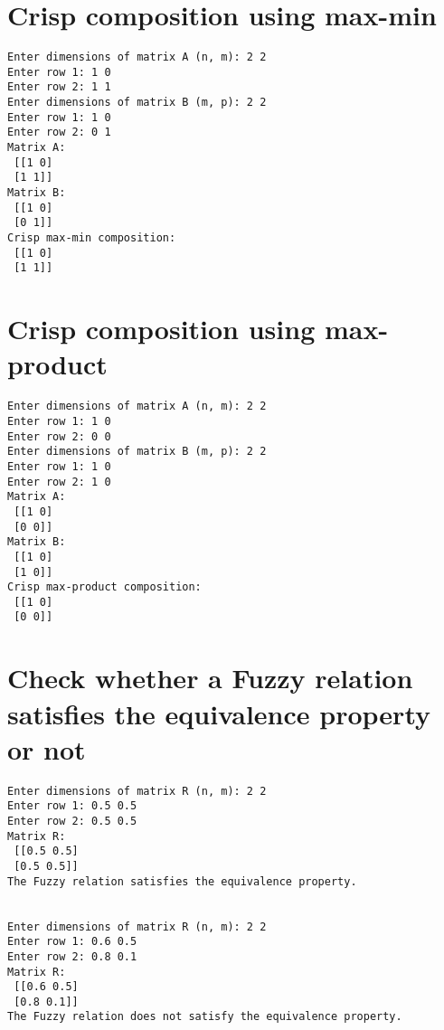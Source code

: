 \documentclass[12pt]{article}
\begin{document}
\newpage
\section{Crisp composition using max-min}



\newpage
\begin{lstlisting}[caption=Output of Crisp max-min composition]
Enter dimensions of matrix A (n, m): 2 2
Enter row 1: 1 0
Enter row 2: 1 1
Enter dimensions of matrix B (m, p): 2 2
Enter row 1: 1 0
Enter row 2: 0 1
Matrix A:
 [[1 0]
 [1 1]]
Matrix B:
 [[1 0]
 [0 1]]
Crisp max-min composition:
 [[1 0]
 [1 1]]
\end{lstlisting}

\newpage
\section{Crisp composition using max-product}



\newpage
\begin{lstlisting}[caption=Output of Crisp max-product composition]
Enter dimensions of matrix A (n, m): 2 2
Enter row 1: 1 0
Enter row 2: 0 0
Enter dimensions of matrix B (m, p): 2 2
Enter row 1: 1 0
Enter row 2: 1 0
Matrix A:
 [[1 0]
 [0 0]]
Matrix B:
 [[1 0]
 [1 0]]
Crisp max-product composition:
 [[1 0]
 [0 0]]
\end{lstlisting}

\newpage
\section{Check whether a Fuzzy relation satisfies the equivalence property or not}



\begin{lstlisting}[caption=Output of Check Fuzzy relation equivalence]
Enter dimensions of matrix R (n, m): 2 2
Enter row 1: 0.5 0.5   
Enter row 2: 0.5 0.5
Matrix R:
 [[0.5 0.5]
 [0.5 0.5]]
The Fuzzy relation satisfies the equivalence property.


Enter dimensions of matrix R (n, m): 2 2
Enter row 1: 0.6 0.5
Enter row 2: 0.8 0.1
Matrix R:
 [[0.6 0.5]
 [0.8 0.1]]
The Fuzzy relation does not satisfy the equivalence property.
\end{lstlisting}
\end{document}
